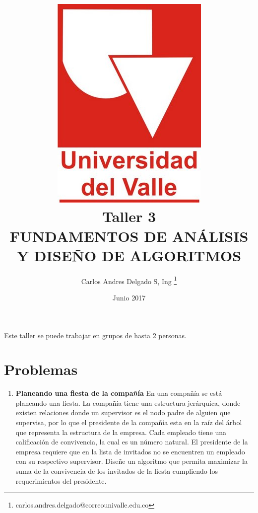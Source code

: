 \documentclass[twocolumn, letterpaper]{article}
\title{	\vspace{-2cm}\includegraphics[scale=0.2]{univalle.jpg} \\ Taller 3 \\FUNDAMENTOS DE ANÁLISIS Y DISEÑO DE ALGORITMOS}
\author{Carlos Andres Delgado S, Ing \footnote{ carlos.andres.delgado@correounivalle.edu.co }}
\date{Junio 2017}
\begin{document}
\maketitle

Este taller se puede trabajar en grupos de hasta 2 personas.

\section{Problemas}


\begin{enumerate}
	\item \textbf{Planeando una fiesta de la compañía} En una compañía se está planeando una fiesta. La compañía tiene una estructura jerárquica, donde existen relaciones donde un supervisor es el nodo padre de alguien que supervisa, por lo que el presidente de la compañía esta en la raíz del árbol que representa la estructura de la empresa. Cada empleado tiene una calificación de convivencia, la cual es un número natural. El presidente de la empresa requiere que en la lista de invitados no se encuentren un empleado con su respectivo supervisor. Diseñe un algoritmo que permita maximizar la suma de la convivencia de los invitados de la fiesta cumpliendo los requerimientos del presidente.

\end{enumerate}
\end{document}
